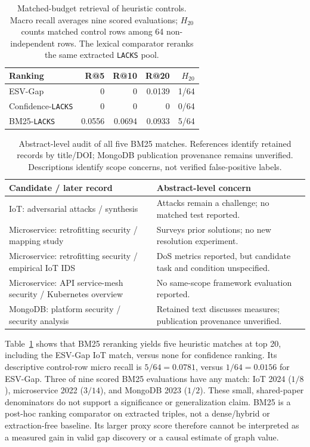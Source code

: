 \documentclass[conference,a4paper]{IEEEtran}
\begin{document}
\begin{table}[t]
\caption{Matched-budget retrieval of heuristic controls. Macro recall averages nine scored evaluations; $H_{20}$ counts matched control rows among 64 non-independent rows. The lexical comparator reranks the same extracted \texttt{LACKS} pool.}
\label{tab:macro}
\centering\footnotesize
\setlength{\tabcolsep}{3pt}
\begin{tabular}{lrrrr}
\toprule
Ranking & R@5 & R@10 & R@20 & $H_{20}$ \\
\midrule
ESV-Gap & 0 & 0 & 0.0139 & 1/64 \\
Confidence-\texttt{LACKS} & 0 & 0 & 0 & 0/64 \\
BM25-\texttt{LACKS} & 0.0556 & 0.0694 & 0.0933 & 5/64 \\
\bottomrule
\end{tabular}
\end{table}

\begin{table}[t]
\caption{Abstract-level audit of all five BM25 matches. References identify retained records by title/DOI; MongoDB publication provenance remains unverified. Descriptions identify scope concerns, not verified false-positive labels.}
\label{tab:errors}
\centering\scriptsize\setlength{\tabcolsep}{3pt}
\begin{tabular}{p{1.18in}p{2.08in}}
\toprule
Candidate / later record & Abstract-level concern \\
\midrule
IoT: adversarial attacks / synthesis~\cite{jayawardena2026} & Attacks remain a challenge; no matched test reported. \\
Microservice: retrofitting security / mapping study~\cite{rahaman2023} & Surveys prior solutions; no new resolution experiment. \\
Microservice: retrofitting security / empirical IoT IDS~\cite{olaya2024} & DoS metrics reported, but candidate task and condition unspecified. \\
Microservice: API service-mesh security / Kubernetes overview~\cite{kampa2024} & No same-scope framework evaluation reported. \\
MongoDB: platform security / security analysis~\cite{singhmongo2024} & Retained text discusses measures; publication provenance unverified. \\
\bottomrule
\end{tabular}
\end{table}

Table~\ref{tab:macro} shows that BM25 reranking yields five heuristic matches at top 20, including the ESV-Gap IoT match, versus none for confidence ranking. Its descriptive control-row micro recall is $5/64=0.0781$, versus $1/64=0.0156$ for ESV-Gap. Three of nine scored BM25 evaluations have any match: IoT 2024 ($1/8$), microservice 2022 ($3/14$), and MongoDB 2023 ($1/2$). These small, shared-paper denominators do not support a significance or generalization claim. BM25 is a post-hoc ranking comparator on extracted triples, not a dense/hybrid or extraction-free baseline. Its larger proxy score therefore cannot be interpreted as a measured gain in valid gap discovery or a causal estimate of graph value.
\end{document}
